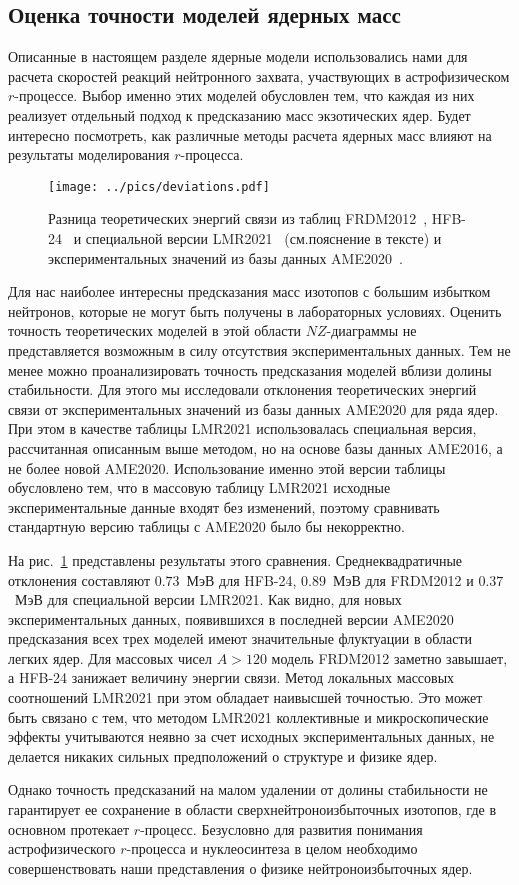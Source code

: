 \subsection{Оценка точности моделей ядерных масс}
Описанные в настоящем разделе ядерные модели использовались нами для расчета скоростей реакций нейтронного захвата, участвующих в астрофизическом $r$-процессе. Выбор именно этих моделей обусловлен тем, что каждая из них реализует отдельный подход к предсказанию масс экзотических ядер. Будет интересно посмотреть, как различные методы расчета ядерных масс влияют на результаты моделирования $r$-процесса.

\begin{figure}
  \centering
  \texttt{[image: ../pics/deviations.pdf]}
  \caption{Разница теоретических энергий связи из таблиц FRDM2012~\cite{moller2016}, HFB-24~\cite{goriely2013} и специальной версии LMR2021~\cite{vladimirova2022} (см.пояснение в тексте) и экспериментальных значений из базы данных AME2020~\cite{huang2021}.}
  \label{fig:deviations}
\end{figure}

Для нас наиболее интересны предсказания масс изотопов с большим избытком нейтронов, которые не могут быть получены в лабораторных условиях. Оценить точность теоретических моделей в этой области $NZ$-диаграммы не представляется возможным в силу отсутствия экспериментальных данных. Тем не менее можно проанализировать точность предсказания моделей вблизи долины стабильности. Для этого мы исследовали отклонения теоретических энергий связи от экспериментальных значений из базы данных AME2020 для ряда ядер. При этом в качестве таблицы LMR2021 использовалась специальная версия, рассчитанная описанным выше методом, но на основе базы данных AME2016, а не более новой AME2020. Использование именно этой версии таблицы обусловлено тем, что в массовую таблицу LMR2021 исходные экспериментальные данные входят без изменений, поэтому сравнивать стандартную версию таблицы с AME2020 было бы некорректно.

На рис.~\ref{fig:deviations} представлены результаты этого сравнения. Среднеквадратичные отклонения составляют $0.73$~МэВ для HFB-24, $0.89$~МэВ для FRDM2012 и $0.37$~МэВ для специальной версии LMR2021. Как видно, для новых экспериментальных данных, появившихся в последней версии AME2020
предсказания всех трех моделей имеют значительные флуктуации в области легких ядер. Для массовых чисел $A > 120$ модель FRDM2012 заметно завышает, а HFB-24 занижает величину энергии связи. Метод локальных массовых соотношений LMR2021 при этом обладает наивысшей точностью. Это может быть связано с тем, что методом LMR2021 коллективные и микроскопические эффекты учитываются неявно за счет исходных экспериментальных данных, не делается никаких сильных предположений о структуре и физике ядер. 

Однако точность предсказаний на малом удалении от долины стабильности не гарантирует ее сохранение в области сверхнейтроноизбыточных изотопов, где в основном протекает $r$-процесс. Безусловно для развития понимания астрофизического $r$-процесса и нуклеосинтеза в целом необходимо совершенствовать наши представления о физике нейтроноизбыточных ядер.

